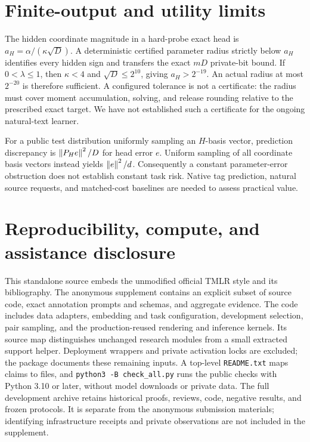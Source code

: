 \section{Finite-output and utility limits}\label{app:certificate}
The hidden coordinate magnitude in a hard-probe exact head is
$a_H=\alpha/(\kappa\sqrt D)$. A deterministic certified parameter radius
strictly below $a_H$ identifies every hidden sign and transfers the
exact $mD$ private-bit bound. If $0<\lambda\le1$, then $\kappa<4$ and
$\sqrt D\le2^{10}$, giving $a_H>2^{-19}$. An actual radius at most
$2^{-20}$ is therefore sufficient. A configured tolerance is not a
certificate: the radius must cover moment accumulation, solving, and
release rounding relative to the prescribed exact target. We have not
established such a certificate for the ongoing natural-text learner.

For a public test distribution uniformly sampling an $H$-basis vector,
prediction discrepancy is $\left\lVert P_H e\right\rVert^2/D$ for head error $e$.
Uniform sampling of all coordinate basis vectors instead yields
$\left\lVert e\right\rVert^2/d$. Consequently a constant parameter-error obstruction does
not establish constant task risk. Native tag prediction, natural source
requests, and matched-cost baselines are needed to assess practical value.

\section{Reproducibility, compute, and assistance disclosure}\label{app:repro}
This standalone source embeds the unmodified official TMLR style and its
bibliography. The anonymous supplement contains an explicit subset of source
code, exact annotation prompts and schemas, and aggregate evidence.
The code includes data adapters, embedding and task configuration, development
selection, pair sampling, and the production-reused rendering and inference
kernels. Its source map distinguishes unchanged research modules from a
small extracted support helper. Deployment wrappers and private activation
locks are excluded; the package documents these remaining inputs.
A top-level \texttt{README.txt} maps claims to files, and
\texttt{python3 -B check\_all.py} runs the public checks with Python 3.10
or later, without model downloads or private data. The full
development archive retains historical proofs, reviews, code, negative results,
and frozen protocols. It is separate from the anonymous submission materials;
identifying infrastructure receipts and private observations are not included
in the supplement.

